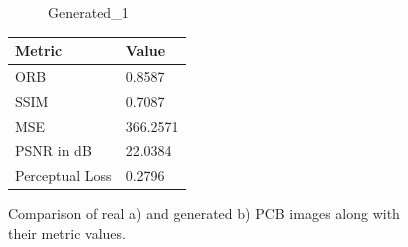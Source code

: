 \documentclass[12pt,DIV14,BCOR12mm,a4paper,footinclude=false,headinclude,parskip=half-,twoside,openright,cleardoublepage=empty,toc=index,bibliography=totoc,listof=totoc]{scrreprt}
\numberwithin{equation}{chapter}
\begin{document}
\begin{figure}
\begin{minipage}[H]{0.5\linewidth}
\begin{subfigure}[t]{0.48\linewidth}
            \caption{Generated\_1}
        \end{subfigure}
    \end{minipage}%
    \hfill
    \begin{minipage}[H]{0.5\linewidth} %
        \centering
        \small
        \begin{tabular}{p{3cm} p{2cm}}
            \toprule
            \textbf{Metric} & \textbf{Value} \\
            \midrule
            ORB             & 0.8587        \\
            SSIM            & 0.7087        \\
            MSE             & 366.2571      \\
            PSNR in dB      & 22.0384       \\
            Perceptual Loss & 0.2796        \\
            \bottomrule
        \end{tabular}
    \end{minipage}%
    \caption{Comparison of real a) and generated b) PCB images along with their metric values.}
    \label{fig:comparison_real_generated_1_1_pcb}
\end{figure}
\end{document}

